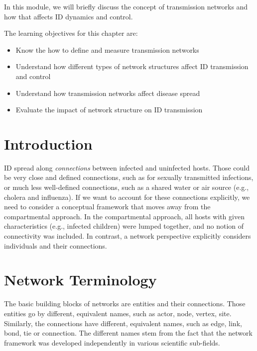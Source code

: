 \documentclass[]{book}
\providecommand{\tightlist}{%
  \setlength{\itemsep}{0pt}\setlength{\parskip}{0pt}}
\theoremstyle{definition}
\theoremstyle{definition}
\theoremstyle{definition}
\theoremstyle{remark}
\begin{document}
In this module, we will briefly discuss the concept of transmission
networks and how that affects ID dynamics and control.

The learning objectives for this chapter are:

\begin{itemize}
\tightlist
\item
  Know the how to define and measure transmission networks
\item
  Understand how different types of network structures affect ID
  transmission and control
\item
  Understand how transmission networks affect disease spread
\item
  Evaluate the impact of network structure on ID transmission
\end{itemize}

\section{Introduction}\label{introduction-17}

ID spread along \emph{connections} between infected and uninfected
hosts. Those could be very close and defined connections, such as for
sexually transmitted infections, or much less well-defined connections,
such as a shared water or air source (e.g., cholera and influenza). If
we want to account for these connections explicitly, we need to consider
a conceptual framework that moves away from the compartmental approach.
In the compartmental approach, all hosts with given characteristics
(e.g., infected children) were lumped together, and no notion of
connectivity was included. In contrast, a network perspective explicitly
considers individuals and their connections.

\section{Network Terminology}\label{network-terminology}

The basic building blocks of networks are entities and their
connections. Those entities go by different, equivalent names, such as
actor, node, vertex, site. Similarly, the connections have different,
equivalent names, such as edge, link, bond, tie or connection. The
different names stem from the fact that the network framework was
developed independently in various scientific sub-fields.
\end{document}
